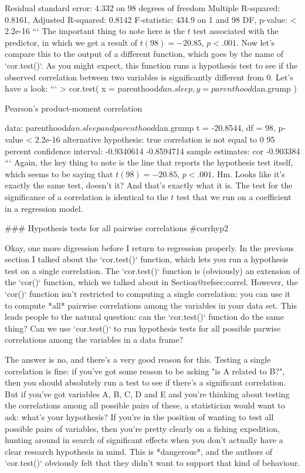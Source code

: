 Residual standard error: 4.332 on 98 degrees of freedom
Multiple R-squared: 0.8161,	Adjusted R-squared: 0.8142 
F-statistic: 434.9 on 1 and 98 DF,  p-value: < 2.2e-16 
```
The important thing to note here is the $t$ test associated with the predictor, in which we get a result of $t(98) = -20.85$, $p<.001$. Now let's compare this to the output of a different function, which goes by the name of `cor.test()`. As you might expect, this function runs a hypothesis test to see if the observed correlation between two variables is significantly different from 0. Let's have a look:
```
> cor.test( x = parenthood$dan.sleep, y = parenthood$dan.grump )

	Pearson's product-moment correlation

data:  parenthood$dan.sleep and parenthood$dan.grump 
t = -20.8544, df = 98, p-value < 2.2e-16
alternative hypothesis: true correlation is not equal to 0 
95 percent confidence interval:
 -0.9340614 -0.8594714 
sample estimates:
      cor 
-0.903384 
```
Again, the key thing to note is the line that reports the hypothesis test itself, which seems to be saying that $t(98) = -20.85$, $p<.001$. Hm. Looks like it's exactly the same test, doesn't it? And that's exactly what it is. The test for the significance of a correlation is identical to the $t$ test that we run on a coefficient in a regression model. 


### Hypothesis tests for all pairwise correlations {#corrhyp2}

Okay, one more digression before I return to regression properly. In the previous section I talked about the `cor.test()` function, which lets you run a hypothesis test on a single correlation. The `cor.test()` function is (obviously) an extension of the `cor()` function, which we talked about in Section@refsec:correl. However, the `cor()` function isn't restricted to computing a single correlation: you can use it to compute *all* pairwise correlations among the variables in your data set. This leads people to the natural question: can the `cor.test()` function do the same thing? Can we use `cor.test()` to run hypothesis tests for all possible parwise correlations among the variables in a data frame?

The answer is no, and there's a very good reason for this. Testing a single correlation is fine: if you've got some reason to be asking "is A related to B?", then you should absolutely run a test to see if there's a significant correlation. But if you've got variables A, B, C, D and E and you're thinking about testing the correlations among all possible pairs of these, a statistician would want to ask: what's your hypothesis? If you're in the position of wanting to test all possible pairs of variables, then you're pretty clearly on a fishing expedition, hunting around in search of significant effects when you don't actually have a clear research hypothesis in mind. This is *dangerous*, and the authors of `cor.test()` obviously felt that they didn't want to support that kind of behaviour.

